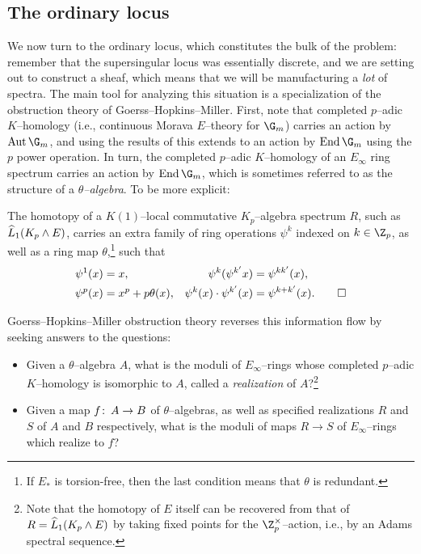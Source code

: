 \subsection*{The ordinary locus}

We now turn to the ordinary locus, which constitutes the bulk of the problem: remember that the supersingular locus was essentially discrete, and we are setting out to construct a sheaf, which means that we will be manufacturing a \emph{lot} of spectra.  The main tool for analyzing this situation is a specialization of the obstruction theory of Goerss--Hopkins--Miller.  First, note that completed $p$--adic $K$--homology (i.e., continuous Morava $E$--theory for $\G_m$) carries an action by $\Aut \G_m$, and using the results of  this extends to an action by $\End \G_m$ using the $p${\th} power operation.  In turn, the completed $p$--adic $K$--homology of an $E_\infty$ ring spectrum carries an action by $\End \G_m$, which is sometimes referred to as the structure of a \textit{$\theta$--algebra}.  To be more explicit:
\begin{theorem}
The homotopy of a $K(1)$--local commutative $K_p$--algebra spectrum $R$, such as $\widehat L_1 (K_p \wedge E)$, carries an extra family of ring operations $\psi^k$ indexed on $k \in \Z_p$, as well as a ring map $\theta$,\footnote{If $E_*$ is torsion-free, then the last condition means that $\theta$ is redundant.} such that
\pushQED{\qed}
\begin{align*}
\psi^1(x) & = x, &
\psi^k (\psi^{k'} x) & = \psi^{kk'}(x), \\
\psi^p(x) & = x^p + p\theta(x), &
\psi^k(x) \cdot \psi^{k'}(x) & = \psi^{k + k'}(x). \qedhere
\end{align*}
\popQED
\end{theorem}
\noindent Goerss--Hopkins--Miller obstruction theory reverses this information flow by seeking answers to the questions:
\begin{itemize}
    \item Given a $\theta$--algebra $A$, what is the moduli of $E_\infty$--rings whose completed $p$--adic $K$--homology is isomorphic to $A$, called a \textit{realization} of $A$?\footnote{Note that the homotopy of $E$ itself can be recovered from that of $R = \widehat L_1 (K_p \wedge E)$ by taking fixed points for the $\Z_p^\times$--action, i.e., by an Adams spectral sequence.}
    \item Given a map $f\colon\thinspace A \to B$ of $\theta$--algebras, as well as specified realizations $R$ and $S$ of $A$ and $B$ respectively, what is the moduli of maps $R \to S$ of $E_\infty$--rings which realize to $f$?
\end{itemize}

